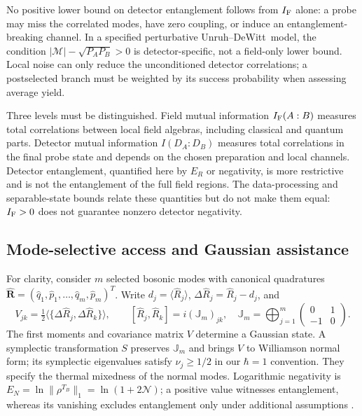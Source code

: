 \documentclass[pdflatex,sn-mathphys-num]{sn-jnl}
\newcommand{\UDW}{Unruh--DeWitt}
\begin{document}
No positive lower bound on detector entanglement follows from $I_{\rm F}$ alone: a probe may miss the correlated modes, have zero coupling, or induce an entanglement-breaking channel. In a specified perturbative \UDW\ model, the condition $|\mathcal M|-\sqrt{P_AP_B}>0$ is detector-specific, not a field-only lower bound. Local noise can only reduce the unconditioned detector correlations; a postselected branch must be weighted by its success probability when assessing average yield.


\label{subsec:three-correlation-levels}

Three levels must be distinguished. Field mutual information $I_{\rm F}(A:B)$ measures total correlations between local field algebras, including classical and quantum parts. Detector mutual information $I(D_A:D_B)$ measures total correlations in the final probe state and depends on the chosen preparation and local channels. Detector entanglement, quantified here by $E_R$ or negativity, is more restrictive and is not the entanglement of the full field regions. The data-processing and separable-state bounds relate these quantities but do not make them equal: $I_{\rm F}>0$ does not guarantee nonzero detector negativity.


\subsection{Mode-selective access and Gaussian assistance}\label{subsec:gaussian-mode-access}

For clarity, consider $m$ selected bosonic modes with canonical quadratures $\hat{\boldsymbol R}=(\hat q_1,\hat p_1,\ldots,\hat q_m,\hat p_m)^T$. Write $d_j=\langle\hat R_j\rangle$, $\Delta\hat R_j=\hat R_j-d_j$, and
\begin{equation}
V_{jk}=\tfrac12\langle\{\Delta\hat R_j,\Delta\hat R_k\}\rangle,
\qquad [\hat R_j,\hat R_k]=i(\mathbb J_m)_{jk},
\quad \mathbb J_m=\bigoplus_{j=1}^{m}\begin{pmatrix}0&1\\-1&0\end{pmatrix}.
\label{eq:gaussian-covariance}
\end{equation}
The first moments and covariance matrix $V$ determine a Gaussian state. A symplectic transformation $S$ preserves $\mathbb J_m$ and brings $V$ to Williamson normal form; its symplectic eigenvalues satisfy $\nu_j\geq1/2$ in our $\hbar=1$ convention. They specify the thermal mixedness of the normal modes. Logarithmic negativity is $E_N=\ln\|\rho^{T_B}\|_1=\ln(1+2\mathcal N)$; a positive value witnesses entanglement, whereas its vanishing excludes entanglement only under additional assumptions \cite{Weedbrook2012}.
\end{document}
